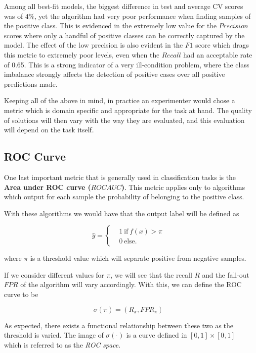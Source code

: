 Among all best-fit models, the biggest difference in test and average CV scores was of $4\%$, yet the algorithm had very poor performance when finding samples of the positive class.
This is evidenced in the extremely low value for the $Precision$ scores where only a handful of positive classes can be correctly captured by the model.
The effect of the low precision is also evident in the $F1$ score which drags this metric to extremely poor levels, even when the $Recall$ had an acceptable rate of 0.65.
This is a strong indicator of a very ill-condition problem, where the class imbalance strongly affects the detection of positive cases over all positive predictions made.

Keeping all of the above in mind, in practice an experimenter would chose a metric which is domain specific and appropriate for the task at hand.
The quality of solutions will then vary with the way they are evaluated, and this evaluation will depend on the task itself.

\subsection{ROC Curve}\label{sub:roc_curve}

One last important metric that is generally used in classification tasks is the \textbf{Area under ROC curve ($ROC AUC$)}.
This metric applies only to algorithms which output for each sample the probability of belonging to the positive class.

With these algorithms we would have that the output label will be defined as

\begin{equation}
\hat{y} =
\begin{cases}
&1 \ \mbox{if} \ f(x) > \pi \\
&0 \ \mbox{else}.
\end{cases}
\end{equation}

where $\pi$ is a threshold value which will separate positive from negative samples.

If we consider different values for $\pi$, we will see that the recall $R$ and the fall-out $FPR$ of the algorithm will vary accordingly.
With this, we can define the ROC curve to be

\begin{equation}
\sigma(\pi) = (R_\pi, FPR_\pi)
\end{equation}

As expected, there exists a functional relationship between these two as the threshold is varied.
The image of $\sigma(\cdot)$ is a curve defined in $[0,1]\times[0,1]$ which is referred to as the \textit{ROC space}.

